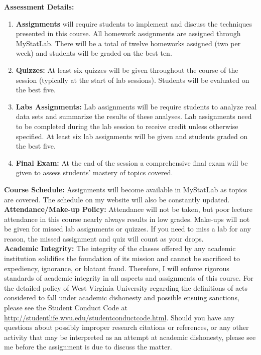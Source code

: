\documentclass[10pt]{article}
\begin{document}
\textbf{Assessment Details:}
\begin{enumerate}
  \item \textbf{Assignments} will require students to implement and
    discuss the techniques presented in this course.  All homework
    assignments are assigned through MyStatLab.  There will be a total
    of twelve homeworks assigned (two per week) and students will be
    graded on the best ten.
  \item \textbf{Quizzes:} At least six quizzes will be given throughout the
    course of the session (typically at the start of lab sessions).
    Students will be evaluated on the best five.
  \item \textbf{Labs Assignments:} Lab assignments will be require
    students to analyze real data sets and summarize the results of
    these analyses.  Lab 
    assignments need to be completed during the lab session to receive
    credit unless otherwise specified. At least six lab assignments will be
    given and students graded on the best five.
  \item \textbf{Final Exam:} At the end of the session a comprehensive
    final exam will be given to assess students' mastery of
    topics covered.
\end{enumerate}

\textbf{Course Schedule:} Assignments will become available in
MyStatLab as topics are covered.  The schedule on my website will also
be constantly updated.\\

\textbf{Attendance/Make-up Policy:} Attendance will not be taken, but poor
lecture attendance in this course nearly always results in low grades.
Make-ups will not be given for missed lab assignments or quizzes.  If
you need to miss a lab for any reason, the missed assignment and quiz
will count as your drops.\\

\textbf{Academic Integrity:} The integrity of the classes offered by any academic institution
solidifies the foundation of its mission and cannot be sacrificed to
expediency, ignorance, or blatant fraud. Therefore, I will enforce
rigorous standards of academic integrity in all aspects and
assignments of this course. For the detailed policy of West Virginia
University regarding the definitions of acts considered to fall under
academic dishonesty and possible ensuing sanctions, please see the
Student Conduct Code at\\
\url{http://studentlife.wvu.edu/studentconductcode.html}. Should you
have any questions about possibly improper research citations or 
references, or any other activity that may be interpreted as an
attempt at academic dishonesty, please see me before the
assignment is due to discuss the matter.\\
\end{document}
